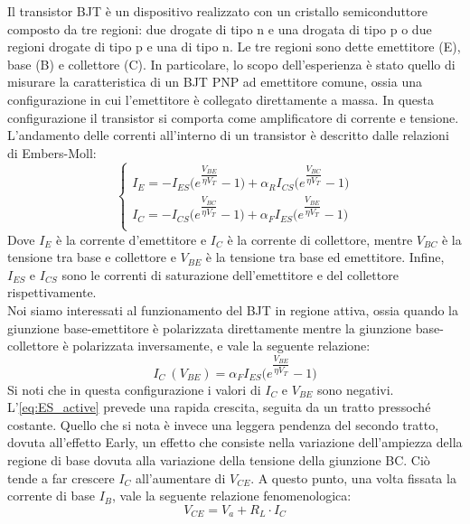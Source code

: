 Il transistor BJT è un dispositivo realizzato con un cristallo semiconduttore composto da tre regioni: due drogate di tipo n e una drogata di tipo p o due regioni drogate di tipo p e una di tipo n. Le tre regioni sono dette emettitore (E), base (B) e collettore (C). In particolare, lo scopo dell’esperienza è stato quello di misurare la caratteristica di un BJT PNP ad emettitore comune, ossia una configurazione in cui l’emettitore è collegato direttamente a massa. In questa configurazione il transistor si comporta come amplificatore di corrente e tensione. 
L’andamento delle correnti all’interno di un transistor è descritto dalle relazioni di Embers-Moll:
\begin{equation}\label{eq:ES_eqs}
    \begin{cases}
    I_E = -I_{ES}\Biggl(e^\dfrac{V_{BE}}{\eta V_T} - 1\Biggl) + \alpha_R I_{CS} \Biggl(e^\dfrac{V_{BC}}{\eta V_T} - 1\Biggl)\\
    I_C = -I_{CS}\Biggl(e^\dfrac{V_{BC}}{\eta V_T} - 1\Biggl) + \alpha_F I_{ES} \Biggl(e^\dfrac{V_{BE}}{\eta V_T} - 1\Biggl)\\
    \end{cases}
\end{equation}
Dove $I_E$ è la corrente d'emettitore e $I_C$ è la corrente di collettore, mentre $V_{BC}$ è la tensione tra base e collettore e $V_{BE}$ è la tensione tra base ed emettitore. Infine, $I_{ES}$ e $I_{CS}$ sono le correnti di saturazione dell’emettitore e del collettore rispettivamente.\\
Noi siamo interessati al funzionamento del BJT in regione attiva, ossia quando la giunzione base-emettitore è polarizzata direttamente mentre la giunzione base-collettore è polarizzata inversamente, e vale la seguente relazione:
\begin{equation}\label{eq:ES_active}
    I_C\ (V_{BE}) = \alpha_F I_{ES}\Biggl(e^\dfrac{V_{BE}}{\eta V_T} - 1\Biggl)
\end{equation}
Si noti che in questa configurazione i valori di $I_C$ e $V_{BE}$ sono negativi. L’\autoref{eq:ES_active} prevede una rapida crescita, seguita da un tratto pressoché costante. Quello che si nota è invece una leggera pendenza del secondo tratto, dovuta all’effetto Early, un effetto che consiste nella variazione dell’ampiezza della regione di base dovuta alla variazione della tensione della giunzione BC. Ciò tende a far crescere $I_C$ all’aumentare di $V_{CE}$. A questo punto, una volta fissata la corrente di base $I_B$, vale la seguente relazione fenomenologica:
\begin{equation*}
    V_{CE} = V_a + R_L \cdot I_C
\end{equation*}
